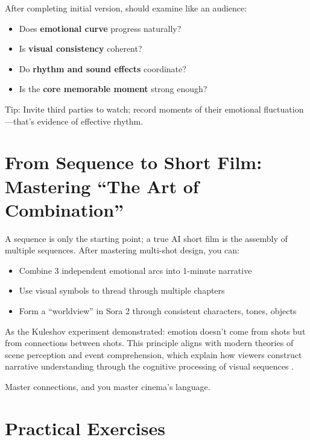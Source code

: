 After completing initial version, should examine like an audience:

\begin{itemize}
\item Does \textbf{emotional curve} progress naturally?
\item Is \textbf{visual consistency} coherent?
\item Do \textbf{rhythm and sound effects} coordinate?
\item Is the \textbf{core memorable moment} strong enough?
\end{itemize}

\begin{Prompt}
Tip: Invite third parties to watch; record moments of their emotional fluctuation—that's evidence of effective rhythm.
\end{Prompt}

\section{From Sequence to Short Film: Mastering ``The Art of Combination''}
\label{sec:sequence-to-film}

A sequence is only the starting point; a true AI short film is the assembly of multiple sequences. After mastering multi-shot design, you can:

\begin{itemize}
\item Combine 3 independent emotional arcs into 1-minute narrative
\item Use visual symbols to thread through multiple chapters
\item Form a ``worldview'' in Sora 2 through consistent characters, tones, objects
\end{itemize}

As the Kuleshov experiment demonstrated: emotion doesn't come from shots but from connections between shots. This principle aligns with modern theories of scene perception and event comprehension, which explain how viewers construct narrative understanding through the cognitive processing of visual sequences \citep{loschky2019scene}.

Master connections, and you master cinema's language.

\section*{Practical Exercises}

